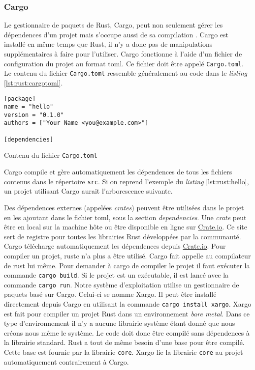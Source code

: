 \subsubsection{Cargo}
Le gestionnaire de paquets de Rust, Cargo, peut non seulement gérer les dépendences
d'un projet mais s'occupe aussi de sa compilation \cite{ref3}. Cargo est installé
en même temps que Rust, il n'y a donc pas de manipulations supplémentaires à faire
pour l'utiliser. Cargo fonctionne à l'aide d'un fichier de configuration du projet
au format \acrshort{toml}. Ce fichier doit être appelé \texttt{Cargo.toml}.
Le contenu du fichier \texttt{Cargo.toml} ressemble généralement
au code dans le \textit{listing} \ref{lst:rust:cargotoml}.

\begin{code}
\begin{verbatim}
[package]
name = "hello"
version = "0.1.0"
authors = ["Your Name <you@example.com>"]

[dependencies]
\end{verbatim}
\caption{Contenu du fichier \texttt{Cargo.toml}}
\label{lst:rust:cargotoml}
\end{code} \bigbreak

Cargo compile et gère automatiquement les dépendences de tous les fichiers contenus
dans le répertoire \texttt{src}. Si on reprend l'exemple du \textit{listing}
\ref{lst:rust:hello}, un projet utilisant Cargo aurait l'arborescence suivante. \\

 \bigbreak

Des dépendences externes (appelées \textit{crates}) peuvent être utilisées dans
le projet en les ajoutant dans le fichier \acrshort{toml}, sous la section \textit{dependencies}.
Une \textit{crate} peut être en local sur la machine hôte ou être disponible en ligne
sur \href{https://crates.io}{Crate.io}. Ce site sert de registre pour toutes les
librairies Rust développées par la communauté. Cargo télécharge automatiquement
les dépendences depuis \href{https://crates.io}{Crate.io}. Pour compiler un projet,
rustc n'a plus a être utilisé. Cargo fait appelle au compilateur
de rust lui même. Pour demander à cargo de compiler le projet il faut exécuter
la commande \texttt{cargo build}. Si le projet est un exécutable,
il est lancé avec la commande \texttt{cargo run}. Notre système
d'exploitation utilise un gestionnaire de paquets basé sur Cargo. Celui-ci
se nomme Xargo. Il peut être installé directement depuis Cargo en utilisant
la commande \texttt{cargo install xargo}. Xargo est fait pour compiler
un projet Rust dans un environnement \textit{bare metal}. Dans ce type d'environnement
il n'y a aucune librairie système étant donné que nous créons nous même le système.
Le code doit donc être compilé sans dépendences à la librairie standard. Rust a tout
de même besoin d'une base pour être compilé. Cette base est fournie par la librairie
\texttt{core}. Xargo lie la librairie \texttt{core} au projet
automatiquement contrairement à Cargo.

